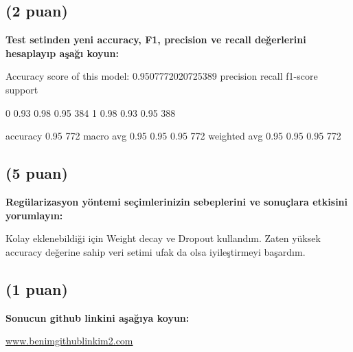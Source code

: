 \documentclass[11pt]{article}
\begin{document}
\subsection{(2 puan)} \textbf{Test setinden yeni accuracy, F1, precision ve recall değerlerini hesaplayıp aşağı koyun:}

\begin{python}
    Accuracy score of this model: 0.9507772020725389
              precision    recall  f1-score   support

           0       0.93      0.98      0.95       384
           1       0.98      0.93      0.95       388

    accuracy                           0.95       772
   macro avg       0.95      0.95      0.95       772
weighted avg       0.95      0.95      0.95       772
\end{python}

\subsection{(5 puan)} \textbf{Regülarizasyon yöntemi seçimlerinizin sebeplerini ve sonuçlara etkisini yorumlayın:}

Kolay eklenebildiği için Weight decay ve Dropout kullandım. Zaten yüksek accuracy değerine sahip veri setimi ufak da olsa iyileştirmeyi başardım.

\subsection{(1 puan)} \textbf{Sonucun github linkini  aşağıya koyun:}

\url{www.benimgithublinkim2.com}
\end{document}
